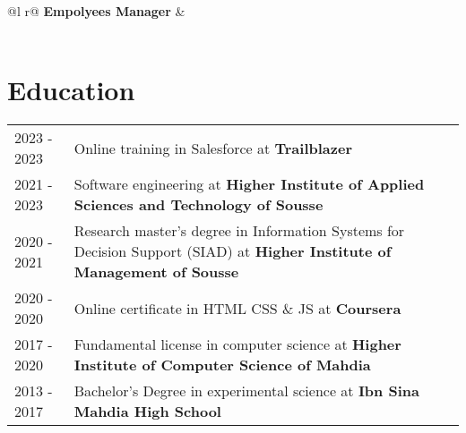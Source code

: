 \documentclass[a4paper,12pt]{article}
\begin{document}
\begin{tabularx}{\linewidth}{ @{}l r@{} }
\textbf{Empolyees Manager} & \hfill  \\[3.75pt]
  \\
\end{tabularx}

\section{Education}
\begin{tabularx}{\linewidth}{@{}l X@{}}	
2023 - 2023 & Online training in Salesforce at \textbf{Trailblazer} \\

2021 - 2023 & Software engineering at \textbf{Higher Institute of Applied Sciences and Technology of
Sousse}  \\

2020 - 2021 & Research master's degree in
Information Systems for Decision Support (SIAD) at \textbf{Higher Institute of Management of Sousse}  \\

2020 - 2020 & Online certificate in HTML CSS \& JS at \textbf{Coursera}  \\

2017 - 2020 & Fundamental license in computer science at \textbf{Higher Institute of Computer Science of Mahdia}  \\

2013 - 2017 & Bachelor's Degree in experimental science at \textbf{Ibn Sina Mahdia High School} 


\end{tabularx}

\end{document}
